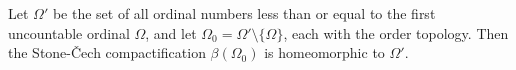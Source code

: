 Let $\Omega'$ be the set of all ordinal numbers less than or equal to the first uncountable ordinal $\Omega$, and let $\Omega_0 = \Omega' \setminus \{\Omega\}$, each with the order topology. Then the Stone-\v{C}ech compactification $\beta(\Omega_0)$ is homeomorphic to $\Omega'$.
